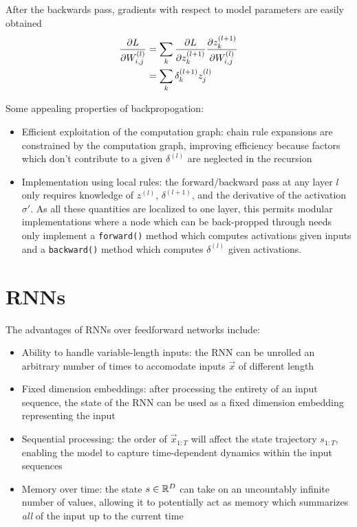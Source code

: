 After the backwards pass, gradients with respect to model parameters are easily obtained
\begin{align}
    \frac{\partial L}{\partial W^{(l)}_{i,j} }
    &= \sum_k \frac{\partial L}{\partial z^{(l+1)}_k} \frac{\partial z^{(l+1)}_k}{\partial W^{(l)}_{i,j}} \\
    &= \sum_k \delta^{(l+1)}_k z^{(l)}_j
\end{align}

Some appealing properties of backpropogation:
\begin{itemize}
    \item Efficient exploitation of the computation graph: chain rule expansions
        are constrained by the computation graph, improving efficiency
        because factors which don't contribute to a given $\delta^{(l)}$
        are neglected in the recursion
    \item Implementation using local rules: the forward/backward pass
        at any layer $l$ only requires knowledge of $z^{(l)}$, $\delta^{(l+1)}$,
        and the derivative of the activation $\sigma'$. As all these quantities are localized
        to one layer, this permits modular implementations where a node which can be back-propped
        through needs only implement a \texttt{forward()} method which computes activations
        given inputs and a \texttt{backward()} method which computes $\delta^{(l)}$ given
        activations.
\end{itemize}


\section{RNNs}

The advantages of RNNs over feedforward networks include:
\begin{itemize}
    \item Ability to handle variable-length inputs: the RNN can be unrolled an arbitrary
        number of times to accomodate inputs $\vec{x}$ of different length
    \item Fixed dimension embeddings: after processing the entirety of an input
        sequence, the state of the RNN can be used as a fixed dimension embedding
        representing the input
    \item Sequential processing: the order of $\vec{x}_{1:T}$ will affect the state
        trajectory $s_{1:T}$, enabling the model to capture time-dependent dynamics
        within the input sequences
    \item Memory over time: the state $s \in \mathbb{R}^D$ can take on an uncountably infinite
        number of values, allowing it to potentially act as memory which summarizes
        \emph{all} of the input up to the current time
\end{itemize}

